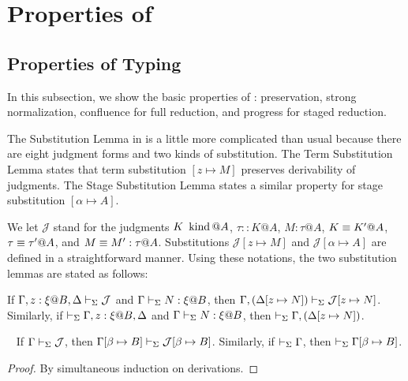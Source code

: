 
\section{Properties of \LMD \label{sec:properties}}

\subsection{Properties of Typing}

In this subsection, we show the basic properties of \LMD: preservation, strong
normalization, confluence for full reduction, and progress for staged
reduction.


The Substitution Lemma in \LMD{} is a little more complicated than usual
because there are eight judgment forms and two kinds of substitution.  The Term
Substitution Lemma states that term substitution $[z \mapsto M]$ preserves
derivability of judgments. The Stage Substitution Lemma states a similar
property for stage substitution $[\alpha\mapsto A]$.  

We let $\mathcal{J}$ stand for the judgments \({K \operatorname{\ kind} @A}\),
\({\tau::K@A}\), \({M:\tau@A}\), \({K \equiv K' @ A}\), \({\tau \equiv \tau' @ A}\),
and \({M \equiv M' : \tau @ A}\).  Substitutions \({\mathcal{J}[z \mapsto M]}\) and
\({\mathcal{J}[\alpha \mapsto A]}\) are defined in a straightforward manner.
Using these notations, the two substitution lemmas are stated as follows:

\begin{lemma}
    \label{lemma:TermSubstitution}
    If \({\G, z:\xi@B, \D \V \mathcal{J}}\) and \({\Gamma\vdash_\Sigma N:\xi @B}\), then \({\Gamma, (\Delta[z \mapsto N]) \vdash_\Sigma \mathcal{J}[z \mapsto N]}\).  Similarly, if \({\V \G, z:\xi@B, \D}\) and
    \( {\Gamma\vdash_\Sigma N:\xi @B} \), then ${ \vdash_\Sigma \Gamma, (\Delta[z \mapsto N]) }$.
\end{lemma}

\begin{lemma}\
    \label{lemma:StageSubstitution}
    If $\Gamma \vdash_\Sigma \mathcal{J}$, then $\Gamma[\beta\mapsto B] \vdash_\Sigma \mathcal{J}[\beta\mapsto B]$.  Similarly, if $\vdash_\Sigma \Gamma$, then $\vdash_\Sigma \Gamma[\beta\mapsto B]$.
\end{lemma}

\begin{proof}
    By simultaneous induction on derivations.
\end{proof}

